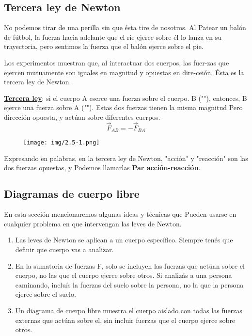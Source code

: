 \documentclass{article}
\newcommand{\newsubsection}[1]{
    \subsection{\color{sectionColor} #1}
}
\newcommand{\bl}[1]{\textbf{#1}}
\newcommand{\definicion}[1]{%
    \begin{definicionbox}
        #1
    \end{definicionbox}
}
\begin{document}
    \newsubsection{Tercera ley de Newton}

    \par No podemos tirar de una perilla sin que ésta tire de nosotros. Al Patear un balón de fútbol, la fuerza hacia adelante que el rie ejerce sobre él lo lanza en su trayectoria, pero sentimos la fuerza que el balón ejerce sobre el pie.
    \par Los experimentos muestran que, al interactuar dos cuerpos, las fuer-zas que ejercen mutuamente son iguales en magnitud y opuestas en dire-ceión. Ésta es la tercera ley de Newton.

    \definicion{
        \par \color{blue}\underline{\bl{Tercera ley}}\color{black}: si el cuerpo A eserce una fuerza sobre el cuerpo. B ("\text{acción}"), entonces, B ejerce una fuerza sobre A ("\text{reacción}"). Estas dos fuerzas tienen la misma magnitud Pero dirección opuesta, y actúan sobre diferentes cuerpos.
        \[\vec{F}_{AB} = - \vec{F}_{BA}\]
    }

    \begin{figure}[H]
        \centering
        \texttt{[image: img/2.5-1.png]}
    \end{figure}

    \par Expresando en palabras, en la tercera ley de Newton, "acción" y "reacción" son las dos fuerzas opuestas, y Podemos llamarlas \bl{Par acción-reacción}.

    \newsubsection{Diagramas de cuerpo libre}

    \par En esta sección mencionaremos algunas ideas y técnicas que Pueden usarse en cualquier problema en que intervengan las leves de Newton.

    \begin{enumerate}
        \item Las leves de Newton se aplican a un cuerpo específico. Siempre tenés que definir que cuerpo vas a analizar.
        \item En la sumatoria de fuerzas F, solo se incluyen las fuerzas que actúan sobre el cuerpo, no las que el cuerpo ejerce sobre otros. Si analizás a una persona caminando, incluís la fuerzas del suelo sobre la persona, no la que la persona ejerce sobre el suelo.
        \item Un diagrama de cuerpo libre muestra el cuerpo aislado con todas las fuerzas externas que actúan sobre el, sin incluir fuerzas que el cuerpo ejerce sobre otros.
    \end{enumerate}
\end{document}
